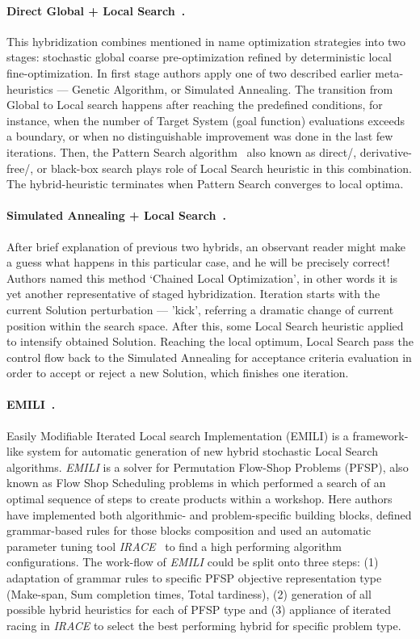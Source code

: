 \paragraph{Direct Global + Local Search~\cite{syrjakow1999efficient}.}
This hybridization combines mentioned in name optimization strategies into two stages: stochastic global coarse pre-optimization refined by deterministic local fine-optimization. In first stage authors apply one of two described earlier meta-heuristics — Genetic Algorithm, or Simulated Annealing. The transition from Global to Local search happens after reaching the predefined conditions, for instance, when the number of Target System (goal function) evaluations exceeds a boundary, or when no distinguishable improvement was done in the last few iterations. Then, the Pattern Search algorithm~\cite{hooke1961direct} also known as direct/, derivative-free/, or black-box search plays role of Local Search heuristic in this combination. The hybrid-heuristic terminates when Pattern Search converges to local optima.

\paragraph{Simulated Annealing + Local Search~\cite{martin1996combining}.}
After brief explanation of previous two hybrids, an observant reader might make a guess what happens in this particular case, and he will be precisely correct!
Authors named this method `Chained Local Optimization', in other words it is yet another representative of staged hybridization. 
Iteration starts with the current Solution perturbation — 'kick', referring a dramatic change of current position within the search space. After this, some Local Search heuristic applied to intensify obtained Solution. Reaching the local optimum, Local Search pass the control flow back to the Simulated Annealing for acceptance criteria evaluation in order to accept or reject a new Solution, which finishes one iteration.

\paragraph{EMILI~\cite{pagnozzi2019automatic}.}
Easily Modifiable Iterated Local search Implementation (EMILI) is a framework-like system for automatic generation of new hybrid stochastic Local Search algorithms. \textit{EMILI} is a solver for Permutation Flow-Shop Problems (PFSP), also known as Flow Shop Scheduling problems in which performed a search of an optimal sequence of steps to create products within a workshop.
Here authors have implemented both algorithmic- and problem-specific building blocks, defined grammar-based rules for those blocks composition and used an automatic parameter tuning tool \textit{IRACE}~\cite{lopez2016irace} to find a high performing algorithm configurations. The work-flow of \textit{EMILI} could be split onto three steps: (1) adaptation of grammar rules to specific PFSP objective representation type (Make-span, Sum completion times, Total tardiness), (2) generation of all possible hybrid heuristics for each of PFSP type and (3) appliance of iterated racing in \textit{IRACE} to select the best performing hybrid for specific problem type. 

